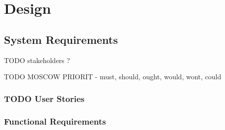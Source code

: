 \chapter{Design}

\section{System Requirements}

TODO stakeholders ?

TODO MOSCOW PRIORIT - must, should, ought, would, wont, could

\subsection{TODO User Stories}

\newpage
\subsection{Functional Requirements}

